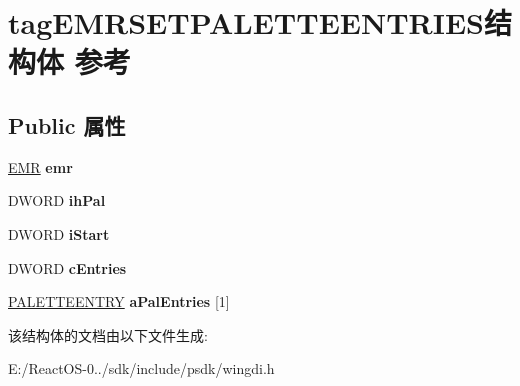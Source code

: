 \hypertarget{structtag_e_m_r_s_e_t_p_a_l_e_t_t_e_e_n_t_r_i_e_s}{}\section{tag\+E\+M\+R\+S\+E\+T\+P\+A\+L\+E\+T\+T\+E\+E\+N\+T\+R\+I\+E\+S结构体 参考}
\label{structtag_e_m_r_s_e_t_p_a_l_e_t_t_e_e_n_t_r_i_e_s}
\subsection*{Public 属性}
\begin{DoxyCompactItemize}
\item 
\mbox{\label{structtag_e_m_r_s_e_t_p_a_l_e_t_t_e_e_n_t_r_i_e_s_af695450b5d19d1e7bd5e5ed6fc60a2d9}} 
\hyperlink{structtag_e_m_r}{E\+MR} {\bfseries emr}
\item 
\mbox{\label{structtag_e_m_r_s_e_t_p_a_l_e_t_t_e_e_n_t_r_i_e_s_ac7112047acfe84728fd52c1d461e4d31}} 
D\+W\+O\+RD {\bfseries ih\+Pal}
\item 
\mbox{\label{structtag_e_m_r_s_e_t_p_a_l_e_t_t_e_e_n_t_r_i_e_s_aa0813cf6afe835da707a0a03293953b0}} 
D\+W\+O\+RD {\bfseries i\+Start}
\item 
\mbox{\label{structtag_e_m_r_s_e_t_p_a_l_e_t_t_e_e_n_t_r_i_e_s_abefb1a23d3af39cda645494a5dbd5524}} 
D\+W\+O\+RD {\bfseries c\+Entries}
\item 
\mbox{\label{structtag_e_m_r_s_e_t_p_a_l_e_t_t_e_e_n_t_r_i_e_s_a3c97e9271192e15eb7f21c6176ee999c}} 
\hyperlink{structtag_p_a_l_e_t_t_e_e_n_t_r_y}{P\+A\+L\+E\+T\+T\+E\+E\+N\+T\+RY} {\bfseries a\+Pal\+Entries} \mbox{[}1\mbox{]}
\end{DoxyCompactItemize}


该结构体的文档由以下文件生成\+:\begin{DoxyCompactItemize}
\item 
E\+:/\+React\+O\+S-\/0../sdk/include/psdk/wingdi.\+h\end{DoxyCompactItemize}
